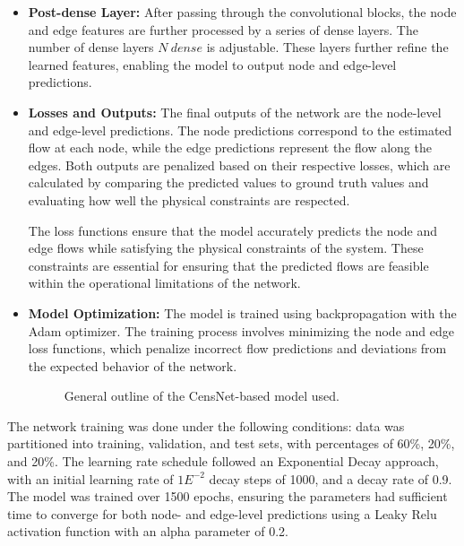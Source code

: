 \begin{itemize}
    \item \textbf{Post-dense Layer:} After passing through the convolutional blocks, the node and edge features are further processed by a series of dense layers. The number of dense layers $N \ dense$ is adjustable. These layers further refine the learned features, enabling the model to output node and edge-level predictions. 
   
    \item \textbf{Losses and Outputs:} The final outputs of the network are the node-level and edge-level predictions. The node predictions correspond to the estimated flow at each node, while the edge predictions represent the flow along the edges. Both outputs are penalized based on their respective losses, which are calculated by comparing the predicted values to ground truth values and evaluating how well the physical constraints are respected.

The loss functions ensure that the model accurately predicts the node and edge flows while satisfying the physical constraints of the system. These constraints are essential for ensuring that the predicted flows are feasible within the operational limitations of the network. 
    \item \textbf{Model Optimization:} The model is trained using backpropagation with the Adam optimizer. The training process involves minimizing the node and edge loss functions, which penalize incorrect flow predictions and deviations from the expected behavior of the network.

\begin{figure}
    \centering
    \setlength{}        
    \setlength{}
    \resizebox{\figurewidth}{\figureheight}{}
    \caption{General outline of the CensNet-based model used.}
    \label{fig:model_description}
\end{figure}
\end{itemize}


The network training was done under the following conditions: data was partitioned into training, validation, and test sets, with percentages of 60\%, 20\%, and 20\%. The learning rate schedule followed an Exponential Decay approach, with an initial learning rate of $1E^{-2}$ decay steps of 1000, and a decay rate of 0.9. The model was trained over 1500 epochs, ensuring the parameters had sufficient time to converge for both node- and edge-level predictions using a Leaky Relu activation function with an alpha parameter of 0.2.


